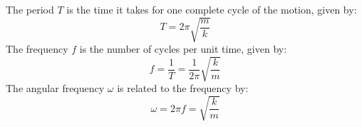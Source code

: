 \documentclass[11pt]{report}
\begin{document}
\begin{definition}
    The period \( T \) is the time it takes for one complete cycle of the motion, given by:
    \begin{equation}
        T = 2\pi \sqrt{\frac{m}{k}}
    \end{equation}
    The frequency \( f \) is the number of cycles per unit time, given by:
    \begin{equation}
        f = \frac{1}{T} = \frac{1}{2\pi} \sqrt{\frac{k}{m}}
    \end{equation}
    The angular frequency \( \omega \) is related to the frequency by:
    \begin{equation}
        \omega = 2\pi f = \sqrt{\frac{k}{m}}
    \end{equation}
    
\end{definition}
\end{document}
